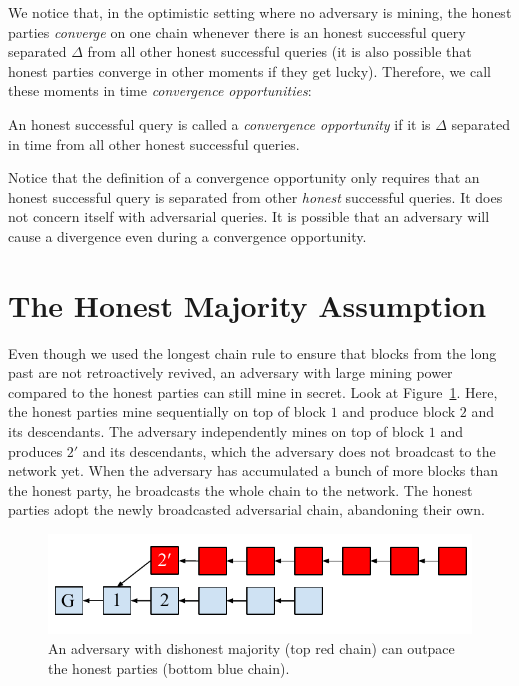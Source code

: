 We notice that, in the optimistic setting where no adversary is mining, the honest parties
\emph{converge} on one chain whenever there is an honest successful query separated $\Delta$
from all other honest successful queries (it is also possible that honest parties converge
in other moments if they get lucky). Therefore, we call these moments in time \emph{convergence
opportunities}:

\begin{definition}
    An honest successful query is called a \emph{convergence opportunity} if it is $\Delta$
    separated in time from all other honest successful queries.
\end{definition}

Notice that the definition of a convergence opportunity only requires that an honest successful
query is separated from other \emph{honest} successful queries. It does not concern itself with
adversarial queries. It is possible that an adversary will cause a divergence even during a
convergence opportunity.

\section{The Honest Majority Assumption}

Even though we used the longest chain rule to ensure that blocks from the long past are not
retroactively revived, an adversary with large mining power compared to the honest parties can
still mine in secret. Look at Figure~\ref{fig.adversarial-majority}. Here, the honest parties
mine sequentially on top of block $1$ and produce block $2$ and its descendants.
The adversary independently mines on top of block $1$ and produces $2'$ and its descendants,
which the adversary does not broadcast to the network yet. When the adversary has accumulated
a bunch of more blocks than the honest party, he broadcasts the whole chain to the network.
The honest parties adopt the newly broadcasted adversarial chain, abandoning their own.

\begin{figure}[h]
    \centering
    \includegraphics[width=0.6 \columnwidth,keepaspectratio]{figures/adversarial-majority.pdf}
    \caption{An adversary with dishonest majority (top red chain) can outpace the honest parties (bottom
             blue chain).}
    \label{fig.adversarial-majority}
\end{figure}

